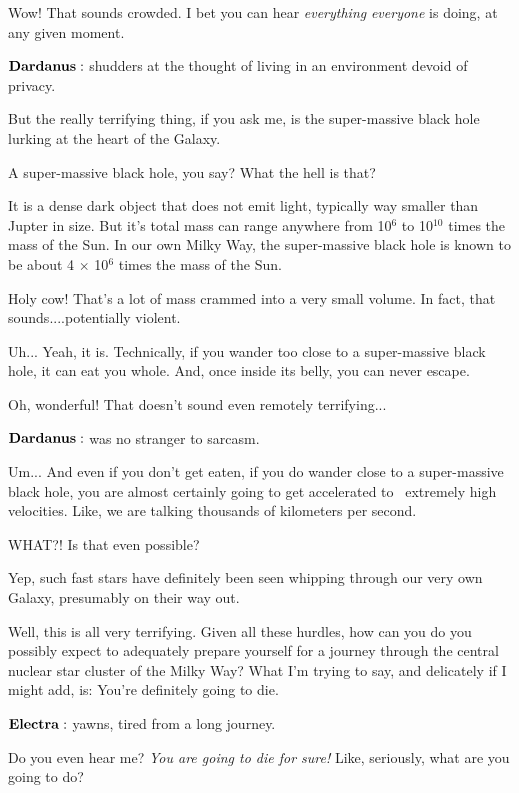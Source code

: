 \Dardanus  Wow!  That sounds crowded.  I bet you can hear \textit{everything} \textit{everyone} is doing, at any given moment.  

$\Dardanus$ shudders at the thought of living in an environment devoid of privacy.

\Electra But the really terrifying thing, if you ask me, is the super-massive black hole lurking at the heart of the Galaxy.

\Dardanus A super-massive black hole, you say?  What the hell is that?

\Electra It is a dense dark object that does not emit light, typically way smaller than Jupter in size.  But it's total mass can range anywhere from 10$^6$ to 10$^{10}$ times the mass of the Sun.  In our own Milky Way, the super-massive black hole is known to be about 4 $\times$ 10$^6$ times the mass of the Sun.

\Dardanus Holy cow!  That's a lot of mass crammed into a very small volume.  In fact, that sounds....potentially violent.

\Electra Uh... Yeah, it is.  Technically, if you wander too close to a super-massive black hole, it can eat you whole.  And, once inside its belly, you can never escape.

\Dardanus  Oh, wonderful!  That doesn't sound even remotely terrifying...

$\Dardanus$ was no stranger to sarcasm.

\Electra Um... And even if you don't get eaten, if you do wander close to a super-massive black hole, you are almost certainly going to get accelerated to \
extremely high velocities.  Like, we are talking thousands of kilometers per second.

\Dardanus  WHAT?!  Is that even possible?

\Electra  Yep, such fast stars have definitely been seen whipping through our very own Galaxy, presumably on their way out.

\Dardanus Well, this is all very terrifying.  Given all these hurdles, how can you do you possibly expect to adequately prepare yourself for a journey through the central nuclear star cluster of the Milky Way?  What I'm trying to say, and delicately if I might add, is:  You're definitely going to die.

$\Electra$ yawns, tired from a long journey.

\Dardanus  Do you even hear me?  \textit{You are going to die for sure!}  Like, seriously, what are you going to do?

